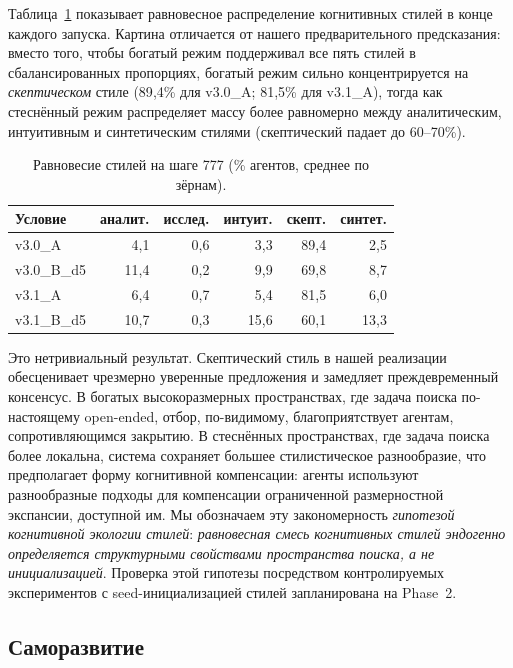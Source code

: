 \documentclass[11pt,a4paper]{article}
\begin{document}
Таблица~\ref{tab:styles-ru} показывает равновесное распределение
когнитивных стилей в конце каждого запуска. Картина отличается
от нашего предварительного предсказания: вместо того, чтобы
богатый режим поддерживал все пять стилей в сбалансированных
пропорциях, богатый режим сильно концентрируется на
\emph{скептическом} стиле (89{,}4\% для v3.0\_A; 81{,}5\% для
v3.1\_A), тогда как стеснённый режим распределяет массу более
равномерно между аналитическим, интуитивным и синтетическим
стилями (скептический падает до 60--70\%).

\begin{table}[h]
\centering
\caption{Равновесие стилей на шаге 777 (\% агентов, среднее по зёрнам).}
\label{tab:styles-ru}
\small
\begin{tabular}{lrrrrr}
\toprule
Условие & аналит. & исслед. & интуит. & скепт. & синтет. \\
\midrule
v3.0\_A     &  4{,}1 & 0{,}6 &  3{,}3 & 89{,}4 & 2{,}5 \\
v3.0\_B\_d5 & 11{,}4 & 0{,}2 &  9{,}9 & 69{,}8 & 8{,}7 \\
v3.1\_A     &  6{,}4 & 0{,}7 &  5{,}4 & 81{,}5 & 6{,}0 \\
v3.1\_B\_d5 & 10{,}7 & 0{,}3 & 15{,}6 & 60{,}1 & 13{,}3 \\
\bottomrule
\end{tabular}
\end{table}

Это нетривиальный результат. Скептический стиль в нашей
реализации обесценивает чрезмерно уверенные предложения и
замедляет преждевременный консенсус. В богатых
высокоразмерных пространствах, где задача поиска по-настоящему
open-ended, отбор, по-видимому, благоприятствует агентам,
сопротивляющимся закрытию. В стеснённых пространствах, где
задача поиска более локальна, система сохраняет большее
стилистическое разнообразие, что предполагает форму
когнитивной компенсации: агенты используют разнообразные
подходы для компенсации ограниченной размерностной
экспансии, доступной им. Мы обозначаем эту закономерность
\emph{гипотезой когнитивной экологии стилей}: \emph{равновесная
смесь когнитивных стилей эндогенно определяется структурными
свойствами пространства поиска, а не инициализацией}. Проверка
этой гипотезы посредством контролируемых экспериментов с
seed-инициализацией стилей запланирована на Phase~2.

\subsection{Саморазвитие}
\end{document}

